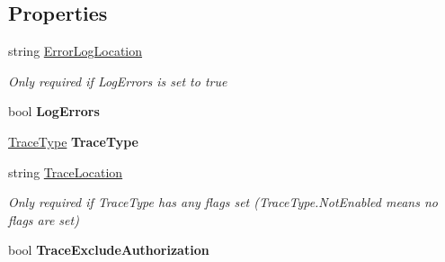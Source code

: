 \subsection*{Properties}
\begin{DoxyCompactItemize}
\item 
string \hyperlink{interface_cloud_api_public_1_1_interfaces_1_1_i_sync_settings_af257eef28e7ac35ee0aff935e74b0236}{Error\-Log\-Location}
\begin{DoxyCompactList}\small\item\em Only required if Log\-Errors is set to true \end{DoxyCompactList}\item 
\hypertarget{interface_cloud_api_public_1_1_interfaces_1_1_i_sync_settings_a853b2289cdb7c431c7a3b9929aa3ca95}{bool {\bfseries Log\-Errors}}\label{interface_cloud_api_public_1_1_interfaces_1_1_i_sync_settings_a853b2289cdb7c431c7a3b9929aa3ca95}

\item 
\hypertarget{interface_cloud_api_public_1_1_interfaces_1_1_i_sync_settings_a8e951c6ebf5666c911215974252653c0}{\hyperlink{namespace_cloud_api_public_1_1_static_a7e5ae8f2a85f427de3d6c8a5afcbb029}{Trace\-Type} {\bfseries Trace\-Type}}\label{interface_cloud_api_public_1_1_interfaces_1_1_i_sync_settings_a8e951c6ebf5666c911215974252653c0}

\item 
string \hyperlink{interface_cloud_api_public_1_1_interfaces_1_1_i_sync_settings_a892cc8d5732bb7fd17f648adaebe9055}{Trace\-Location}
\begin{DoxyCompactList}\small\item\em Only required if Trace\-Type has any flags set (Trace\-Type.\-Not\-Enabled means no flags are set) \end{DoxyCompactList}\item 
\hypertarget{interface_cloud_api_public_1_1_interfaces_1_1_i_sync_settings_a13944c215e600cc8c566c1a4c0405b1b}{bool {\bfseries Trace\-Exclude\-Authorization}}\label{interface_cloud_api_public_1_1_interfaces_1_1_i_sync_settings_a13944c215e600cc8c566c1a4c0405b1b}


\end{DoxyCompactItemize}

